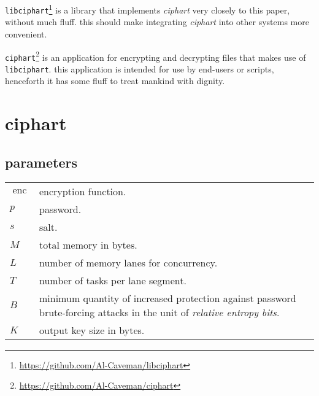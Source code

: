 \documentclass[twocolumn]{article}
\DeclareMathOperator{\enc}{enc}
\begin{document}
\texttt{libciphart}\footnote{\url{https://github.com/Al-Caveman/libciphart}}
is a library that implements \emph{ciphart} very closely to this paper,
without much fluff.  this should make integrating \emph{ciphart} into other
systems more convenient.

\texttt{ciphart}\footnote{\url{https://github.com/Al-Caveman/ciphart}} is
an application for encrypting and decrypting files that makes use of
\texttt{libciphart}.  this application is intended for use by end-users or
scripts, henceforth it has some fluff to treat mankind with dignity.
\vfill
\break

\tableofcontents

\section{ciphart}
\subsection{parameters}
\begin{tabularx}{\columnwidth}{lX}
    $\enc$ & encryption function.\\
    $p$ & password.\\
    $s$ & salt.\\
    $M$ & total memory in bytes.\\
    $L$ & number of memory lanes for concurrency.\\
    $T$ & number of tasks per lane segment.\\
    $B$ & minimum quantity of increased protection against password
            brute-forcing attacks in the unit of \emph{relative entropy
            bits}.\\
    $K$ & output key size in bytes.\\
\end{tabularx}
\end{document}
